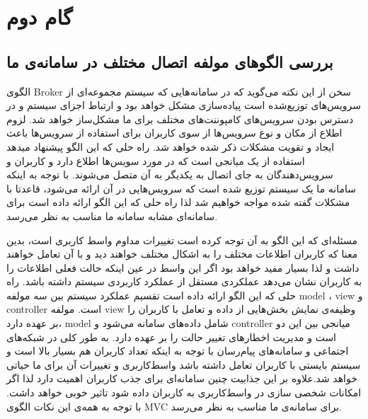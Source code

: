 \chapter{گام دوم}\label{chap:2}
\section{بررسی ‌الگوهای مولفه اتصال مختلف در سامانه‌ی ما}


الگوی ‌‌Broker سخن از این نکته می‌گوید که در سامانه‌هایی که سیستم مجموعه‌ای از سرویس‌های توزیع‌شده است  پیاده‌سازی مشکل خواهد بود و ارتباط  اجزای سیستم و در دسترس بودن سرویس‌های کامپوننت‌های مختلف برای ما مشکل‌ساز خواهد شد. لزوم اطلاع از مکان و نوع سرویس‌ها از سوی  کاربران  برای استفاده از سرویس‌ها باعث ایجاد و تقویت مشکلات ذکر شده خواهد شد. راه حلی که این الگو پیشنهاد میدهد استفاده از یک میانجی است که در مورد سویس‌ها اطلاع دارد و کاربران و سرویس‌دهندگان به جای اتصال به یکدیگر به آن متصل می‌شوند. با توجه به اینکه سامانه ما یک سیستم توزیع شده است که سرویس‌هایی در آن ارائه می‌شود، قاعدتا با مشکلات گفته شده مواجه خواهیم شد لذا راه حلی که این الگو  ارائه داده است  برای سامانه‌ای مشابه سامانه ما مناسب به نظر می‌رسد.




مسئله‌ای که این الگو به آن توجه کرده است تغییرات مداوم واسط کاربری است، بدین معنا که کاربران اطلاعات مختلف را به اشکال مختلف خواهند دید و با آن تعامل خواهند داشت و لذا بسیار  مفید خواهد بود اگر این واسط در عین اینکه  حالت فعلی اطلاعات را به کاربران نشان می‌دهد عملکردی مستقل از عملکرد کاربردی سیستم داشته باشد. راه حلی که این الگو ارائه داده است تقسیم عملکرد سیستم بین سه مولفه model ، view و controller است. مولفه view وظیفه‌ی نمایش بخش‌هایی از داده و تعامل با کاربران را بر عهده دارد، model شامل داده‌های سامانه می‌شود و controller میانجی بین این دو است و مدیریت اخطارهای تغییر حالت را بر عهده دارد. به طور کلی در شبکه‌های اجتماعی و سامانه‌های پیام‌رسان با توجه به اینکه تعداد کاربران هم بسیار بالا است و سیستم بایستی با کاربران تعامل داشته باشد واسط‌کاربری و تغییرات آن برای ما حیاتی خواهد شد.علاوه بر این جذابیت چنین سامانه‌ای برای جذب کاربران اهمیت دارد لذا اگر امکانات شخصی سازی در  واسط‌کاربری به کاربران داده شود تاثیر خوبی خواهد داشت. با توجه به همه‌ی این نکات الگوی MVC برای سامانه‌ی ما مناسب به نظر می‌رسد.

